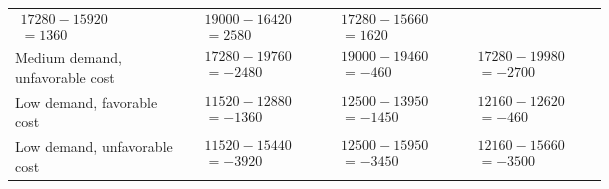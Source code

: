 \begin{ExamProblems}
\begin{center}
\begin{tabular}{l p{0.23\linewidth} p{0.23\linewidth} p{0.23\linewidth}}
				$\begin{array}{l}
					17280 - 15920\\
					= 1360
				\end{array}$ &
				$\begin{array}{l}
					19000 - 16420\\
					= 2580
				\end{array}$ &
				$\begin{array}{l}
					17280 - 15660\\
					= 1620
				\end{array}$ \\
				Medium demand, unfavorable cost &
				$\begin{array}{l}
					17280 - 19760\\
					= -2480
				\end{array}$ &
				$\begin{array}{l}
					19000 - 19460\\
					= -460
				\end{array}$ &
				$\begin{array}{l}
					17280 - 19980\\
					= -2700
				\end{array}$ \\
				Low demand, favorable cost &
				$\begin{array}{l}
					11520 - 12880\\
					= -1360
				\end{array}$ &
				$\begin{array}{l}
					12500 - 13950\\
					= -1450
				\end{array}$ &
				$\begin{array}{l}
					12160 - 12620\\
					= -460
				\end{array}$ \\
				Low demand, unfavorable cost &
				$\begin{array}{l}
					11520 - 15440\\
					= -3920
				\end{array}$ &
				$\begin{array}{l}
					12500 - 15950\\
					= -3450
				\end{array}$ &
				$\begin{array}{l}
					12160 - 15660\\
					= -3500
				\end{array}$ \\

\end{tabular}
\end{center}
\end{ExamProblems}
